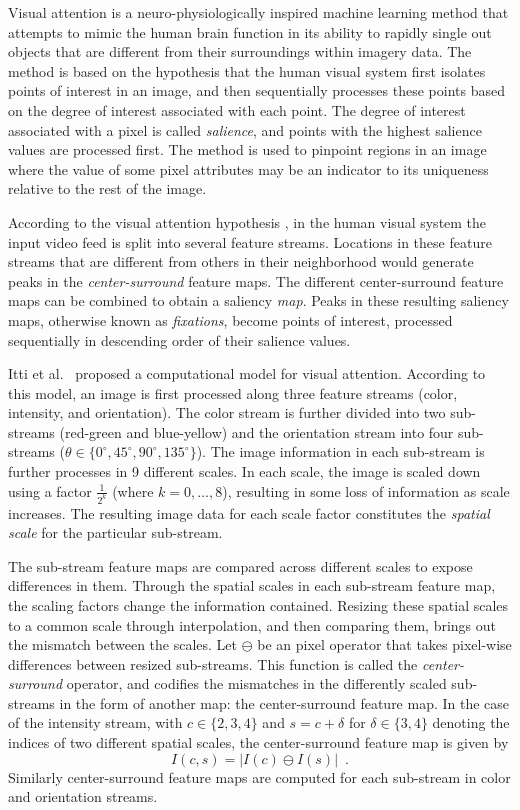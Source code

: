 \documentclass {udthesis}
\begin{document}
Visual attention is a neuro-physiologically inspired machine learning method \cite{koch}
that attempts to mimic the human brain function in its ability to rapidly single out
objects that are different from their surroundings within imagery data.
The method is based on the hypothesis that the human visual system first isolates 
points of interest in an image, and then sequentially processes these points 
based on the degree of interest associated with each point.
The degree of interest associated with a pixel is called \emph{salience},
and points with the highest salience values are processed first.
The method is used to pinpoint 
regions in an image where the value of some pixel attributes may be an indicator to
its uniqueness relative to the rest of the image.  

According to the visual attention hypothesis \cite{koch}, in the 
human visual system the input video feed 
is split into several feature streams.
Locations in these feature streams that are different from others in their neighborhood would generate 
peaks in the \emph{center-surround} feature maps.
The different center-surround feature maps can be combined to obtain a 
saliency \emph{map}.
Peaks in these resulting saliency maps, otherwise known as \emph{fixations}, become 
points of interest, processed sequentially in descending order of their salience values.

Itti et al.~\cite{itti} proposed a computational model for visual attention.
According to this model, an image is first processed along three feature streams 
(color, intensity, and orientation).  
The color stream is further divided into two sub-streams (red-green and blue-yellow) and 
the orientation stream into four sub-streams 
($\theta \in \{0^\circ, 45^\circ, 90^\circ, 135^\circ\}$).
The image information in each sub-stream is further processes in 9 different scales.
In each scale, the image is scaled down using a factor $\frac{1}{2^k}$ (where $k = 0,\ldots,8$),
resulting in some loss of information as scale increases.
The resulting image data for each scale factor constitutes the
\emph{spatial scale} for the particular sub-stream.

The sub-stream feature maps are compared across different scales to expose
differences in them. Through the spatial scales in each sub-stream feature map, the scaling factors change the information
contained. Resizing these spatial scales to a common scale through interpolation, and then comparing them, brings out 
the mismatch between the scales.
Let $\ominus$ be an pixel operator that takes pixel-wise differences between resized sub-streams.  This function is called the \emph{center-surround} operator, and codifies the mismatches in the differently scaled sub-streams in the form of another map: the center-surround feature map.  In the case of
the intensity stream, with $c\in\{2,3,4\}$ and $s=c+\delta$ for $\delta \in \{3,4\}$ denoting the indices of two different spatial scales, the center-surround feature map is given by
%
\begin{equation} \label{intensity-CS}
 I(c,s)=\left|I(c)\ominus I(s)\right| \enspace.
\end{equation}
%
Similarly center-surround feature maps are computed for each sub-stream 
in color and orientation streams. 
\end{document}
